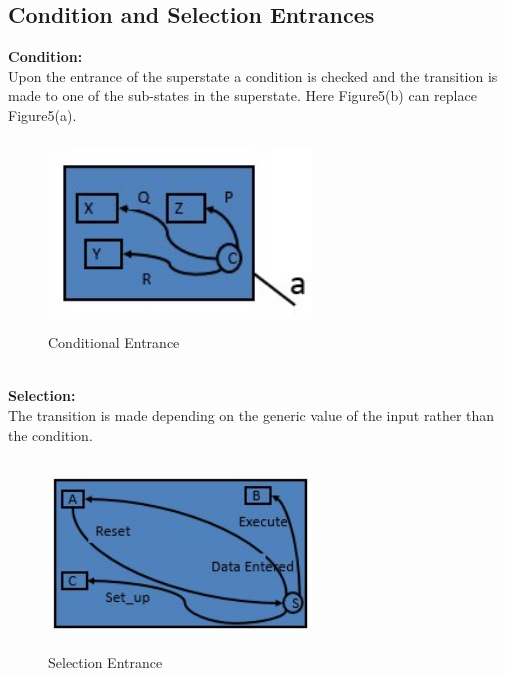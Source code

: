 \documentclass{article}
\begin{document}
\subsection{Condition and Selection Entrances}
\textbf{Condition:}\\
Upon the entrance of the superstate a condition is checked and the transition is made to one of the sub-states in the superstate. Here Figure5(b) can replace  Figure5(a).\\ 
\begin{figure}[h]
\centering
\includegraphics[width=7cm,height=5cm]{Screenshot004.jpg}
\caption{Conditional Entrance}
\end{figure}\\
\textbf{Selection:}\\
The transition is made depending on the generic value of the input rather than the condition.
\begin{figure}[h]
\centering
\includegraphics[width=7cm,height=5cm]{Screenshot005.jpg}
\caption{Selection Entrance}
\end{figure}\\
\newpage
\end{document}
